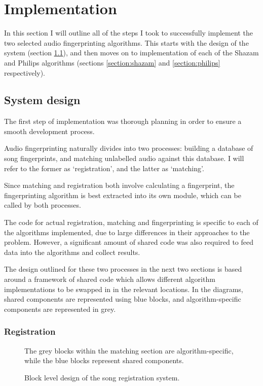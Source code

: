 \documentclass[12pt,a4paper,twoside,openright]{report}
\begin{document}

\chapter{Implementation}
\label{implementation}

In this section I will outline all of the steps I took to successfully implement the two selected audio fingerprinting algorithms. This starts with the design of the system (section \ref{section:systemdesign}), and then moves on to implementation of each of the Shazam and Philips algorithms (sections \ref{section:shazam} and \ref{section:philips} respectively).


\section{System design}
\label{section:systemdesign}

The first step of implementation was thorough planning in order to ensure a smooth development process. 

Audio fingerprinting naturally divides into two processes: building a database of song fingerprints, and matching unlabelled audio against this database. I will refer to the former as `registration', and the latter as `matching'.

Since matching and registration both involve calculating a fingerprint, the fingerprinting algorithm is best extracted into its own module, which can be called by both processes.

The code for actual registration, matching and fingerprinting is specific to each of the algorithms implemented, due to large differences in their approaches to the problem. However, a significant amount of shared code was also required to feed data into the algorithms and collect results.

The design outlined for these two processes in the next two sections is based around a framework of shared code which allows different algorithm implementations to be swapped in in the relevant locations. In the diagrams, shared components are represented using blue blocks, and algorithm-specific components are represented in grey. 


\subsection{Registration}

\begin{figure}[htb]
  \centering
  
  \caption{Block level design of the song registration system.}
  \label{figs:registration_design}
  \medskip \small
  The grey blocks within the matching section are algorithm-specific, while the blue blocks represent shared components.
\end{figure}
\end{document}
